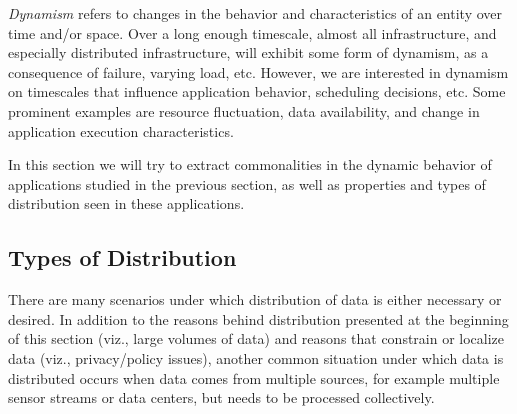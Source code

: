 \emph{Dynamism} refers to changes in the behavior and characteristics
of an entity %
over time and/or space.  Over a long enough timescale, almost all
infrastructure, and especially distributed infrastructure, will
exhibit some form of dynamism, as a consequence of failure, varying
load, etc. However, we are interested in dynamism on timescales that
influence application behavior, scheduling decisions, etc. Some
prominent examples are resource fluctuation, data availability, and
change in application execution characteristics.

In this section we will try to extract commonalities in the dynamic
behavior of applications studied in the previous section, as well as
properties and types of distribution seen in these applications.



\subsection{Types of Distribution \label{sec:distTypes}}

There are many scenarios under which distribution of data is either
necessary or desired. In addition to the reasons behind distribution
presented at the beginning of this section (viz., large volumes of
data) and reasons that constrain or localize data (viz.,
privacy/policy issues), another common situation under which data is
distributed occurs when data comes from multiple sources, for example
multiple sensor streams or data centers, but needs to be processed
collectively.





